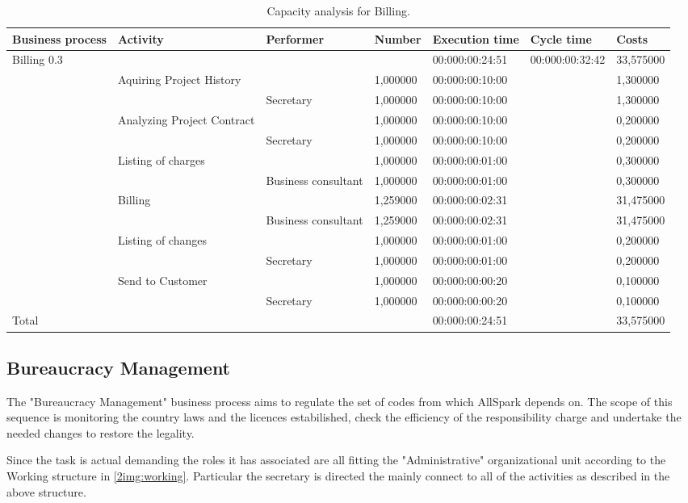 \begin{table}
\centering
{\tiny
\begin{tabular}{|l|l|l|l|l|l|l|}
Business process&Activity&Performer&Number&Execution time&Cycle time&Costs\\
\hline
Billing 0.3&&&&00:000:00:24:51&00:000:00:32:42&33,575000\\
\hline
&Aquiring Project History &&1,000000&00:000:00:10:00&&1,300000\\
\hline
&&Secretary&1,000000&00:000:00:10:00&&1,300000\\
\hline
&Analyzing Project Contract &&1,000000&00:000:00:10:00&&0,200000\\
\hline
&&Secretary&1,000000&00:000:00:10:00&&0,200000\\
\hline
&Listing of charges &&1,000000&00:000:00:01:00&&0,300000\\
\hline
&&Business consultant&1,000000&00:000:00:01:00&&0,300000\\
\hline
&Billing &&1,259000&00:000:00:02:31&&31,475000\\
\hline
&&Business consultant&1,259000&00:000:00:02:31&&31,475000\\
\hline
&Listing of changes &&1,000000&00:000:00:01:00&&0,200000\\
\hline
&&Secretary&1,000000&00:000:00:01:00&&0,200000\\
\hline
&Send to Customer &&1,000000&00:000:00:00:20&&0,100000\\
\hline
&&Secretary&1,000000&00:000:00:00:20&&0,100000\\
\hline
Total&&&&00:000:00:24:51&&33,575000
\end{tabular}
}
\caption{Capacity analysis for Billing.}
\end{table}
%

%

\subsection{Bureaucracy Management}
The "Bureaucracy Management" business process aims to regulate the set of codes from which AllSpark depends on. The scope of this sequence is monitoring the country laws and the licences estabilished, check the efficiency of the responsibility charge and undertake the needed changes to restore the legality.

Since the task is actual demanding the roles it has associated are all fitting the "Administrative" organizational unit according to the Working structure in \ref{2img:working}. Particular the secretary is directed the mainly connect to all of the activities as described in the above structure.

